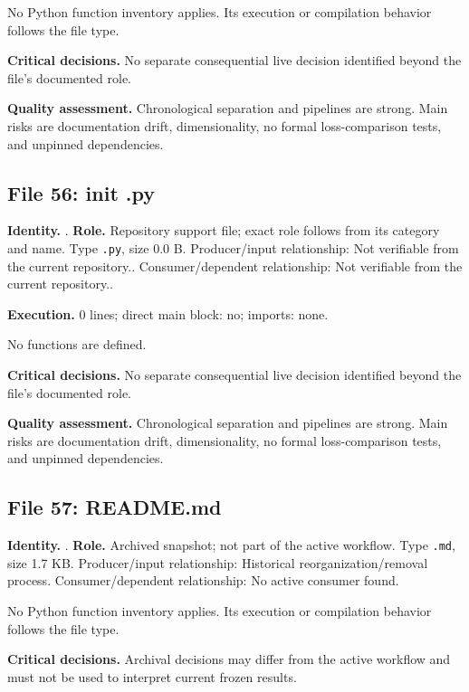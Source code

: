 \documentclass[
  11pt,
  a4paper]{article}
\newcounter{none} %
\begin{document}
No Python function inventory applies. Its execution or compilation
behavior follows the file type.

\textbf{Critical decisions.} No separate consequential live decision
identified beyond the file's documented role.

\textbf{Quality assessment.} Chronological separation and pipelines are
strong. Main risks are documentation drift, dimensionality, no formal
loss-comparison tests, and unpinned dependencies.

\subsection{File 56: init .py}\label{file-4362578153989582210}

\textbf{Identity.} . \textbf{Role.}
Repository support file; exact role follows from its category and name.
Type \texttt{.py}, size 0.0 B. Producer/input relationship: Not
verifiable from the current repository.. Consumer/dependent
relationship: Not verifiable from the current repository..

\textbf{Execution.} 0 lines; direct main block: no; imports: none.

No functions are defined.

\textbf{Critical decisions.} No separate consequential live decision
identified beyond the file's documented role.

\textbf{Quality assessment.} Chronological separation and pipelines are
strong. Main risks are documentation drift, dimensionality, no formal
loss-comparison tests, and unpinned dependencies.

\subsection{File 57: README.md}\label{file-3485093866532813258}

\textbf{Identity.}
.
\textbf{Role.} Archived snapshot; not part of the active workflow. Type
\texttt{.md}, size 1.7 KB. Producer/input relationship: Historical
reorganization/removal process. Consumer/dependent relationship: No
active consumer found.

No Python function inventory applies. Its execution or compilation
behavior follows the file type.

\textbf{Critical decisions.} Archival decisions may differ from the
active workflow and must not be used to interpret current frozen
results.
\end{document}
